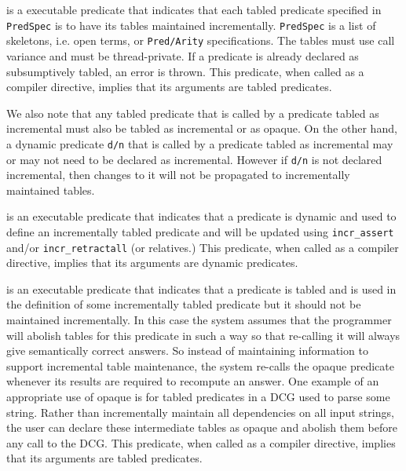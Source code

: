 \begin{description}
 is
a executable predicate that indicates that each tabled predicate
specified in {\tt PredSpec} is to have its tables maintained
incrementally.  {\tt PredSpec} is a list of skeletons, i.e. open
terms, or {\tt Pred/Arity} specifications.  The tables must use call
variance and must be thread-private.  If a predicate is already
declared as subsumptively tabled, an error is thrown.  This predicate,
when called as a compiler directive, implies that its arguments are
tabled predicates.

We also note that any tabled predicate that is called by a predicate
tabled as incremental must also be tabled as incremental or as opaque.
On the other hand, a dynamic predicate {\tt d/n} that is called by a
predicate tabled as incremental may or may not need to be declared as
incremental.  However if {\tt d/n} is not declared incremental, then
changes to it will not be propagated to incrementally maintained
tables.

%
is an executable predicate that indicates that a predicate is dynamic
and used to define an incrementally tabled predicate and will be
updated using {\tt incr\_assert} and/or {\tt incr\_retractall} (or
relatives.)  This predicate, when called as a compiler directive,
implies that its arguments are dynamic predicates.

%
is an executable predicate that indicates that a predicate is tabled
and is used in the definition of some incrementally tabled predicate
but it should not be maintained incrementally.  In this case the
system assumes that the programmer will abolish tables for this
predicate in such a way so that re-calling it will always give
semantically correct answers.  So instead of maintaining information
to support incremental table maintenance, the system re-calls the
opaque predicate whenever its results are required to recompute an
answer.  One example of an appropriate use of opaque is for tabled
predicates in a DCG used to parse some string.  Rather than
incrementally maintain all dependencies on all input strings, the user
can declare these intermediate tables as opaque and abolish them
before any call to the DCG.  This predicate, when called as a compiler
directive, implies that its arguments are tabled predicates.

\end{description}

